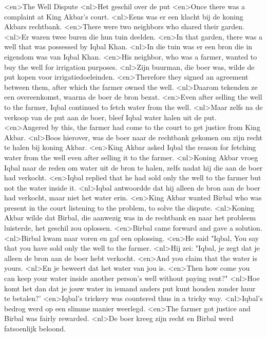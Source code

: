 <en>The Well Dispute
<nl>Het geschil over de put
<en>Once there was a complaint at King Akbar's court.
<nl>Eens was er een klacht bij de koning Akbars rechtbank.
<en>There were two neighbors who shared their garden.
<nl>Er waren twee buren die hun tuin deelden.
<en>In that garden, there was a well that was possessed by Iqbal Khan.
<nl>In die tuin was er een bron die in eigendom was van Iqbal Khan.
<en>His neighbor, who was a farmer, wanted to buy the well for irrigation purposes.
<nl>Zijn buurman, die boer was, wilde de put kopen voor irrigatiedoeleinden.
<en>Therefore they signed an agreement between them, after which the farmer owned the well.
<nl>Daarom tekenden ze een overeenkomst, waarna de boer de bron bezat.
<en>Even after selling the well to the farmer, Iqbal continued to fetch water from the well.
<nl>Maar zelfs na de verkoop van de put aan de boer, bleef Iqbal water halen uit de put.
<en>Angered by this, the farmer had come to the court to get justice from King Akbar.
<nl>Boos hierover, was de boer naar de rechtbank gekomen om zijn recht te halen bij  koning Akbar.
<en>King Akbar asked Iqbal the reason for fetching water from the well even after selling it to the farmer.
<nl>Koning Akbar vroeg Iqbal naar de reden om water uit de bron te halen, zelfs nadat hij die aan de boer had verkocht.
<en>Iqbal replied that he had sold only the well to the farmer but not the water inside it.
<nl>Iqbal antwoordde dat hij alleen de bron aan de boer had verkocht, maar niet het water erin.
<en>King Akbar wanted Birbal who was present in the court listening to the problem, to solve the dispute.
<nl>Koning Akbar wilde dat Birbal, die aanwezig was in de rechtbank en naar het probleem luisterde, het geschil zou oplossen.
<en>Birbal came forward and gave a solution.
<nl>Birbal kwam naar voren en gaf een oplossing.
<en>He said "Iqbal, You say that you have sold only the well to the farmer.
<nl>Hij zei: "Iqbal, je zegt dat je alleen de bron aan de boer hebt verkocht.
<en>And you claim that the water is yours.
<nl>En je beweert dat het water van jou is.
<en>Then how come you can keep your water inside another person's well without paying rent?"
<nl>Hoe komt het dan dat je jouw water in iemand anders put kunt houden zonder huur te betalen?'
<en>Iqbal's trickery was countered thus in a tricky way.
<nl>Iqbal's bedrog werd op een slimme manier weerlegd.
<en>The farmer got justice and Birbal was fairly rewarded.
<nl>De boer kreeg zijn recht en Birbal werd fatsoenlijk beloond.

